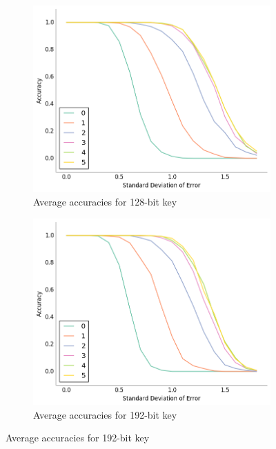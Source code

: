 \documentclass[11pt,letterpaper]{article}
\begin{document}
\begin{figure}[htp]
    \centering
    \begin{subfigure}{0.48\textwidth}
        \centering
        \includegraphics[width=\textwidth]{Images/accuracy_128.png}
        \caption{Average accuracies for 128-bit key}
    \end{subfigure}
    \hspace{.35cm}
    \begin{subfigure}{0.48\textwidth}
        \centering
        \includegraphics[width=\textwidth]{Images/accuracy_192.png}
        \caption{Average accuracies for 192-bit key}
    \end{subfigure}%


\end{figure}
\end{document}
